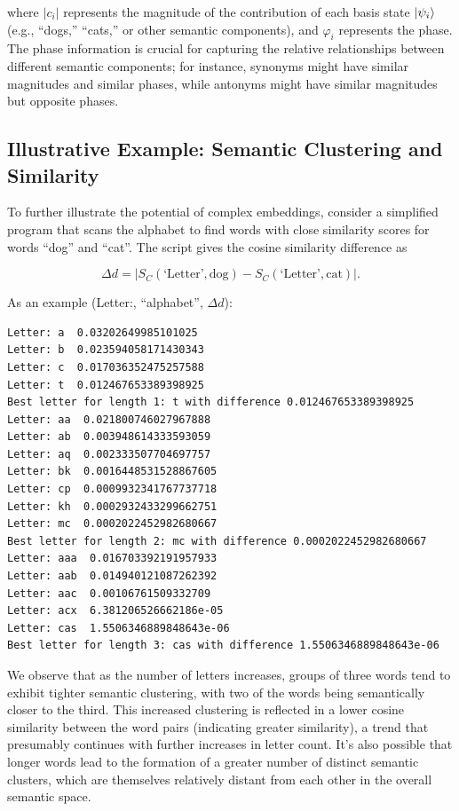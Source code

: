 \documentclass[prd,amsmath,amssymb,12pt]{revtex4}
\DeclarePairedDelimiter\ket{\lvert}{\rangle}
\begin{document}
\noindent
where $|c_i|$ represents the magnitude of the contribution of each basis state $\ket{\psi_i}$
(e.g., ``dogs,'' ``cats,'' or other semantic components), and $\varphi_i$ represents the phase.
The phase information is crucial for capturing the relative relationships between different
semantic components; for instance, synonyms might have similar magnitudes and similar phases,
while antonyms might have similar magnitudes but opposite phases.

\subsection{Illustrative Example: Semantic Clustering and Similarity}

To further illustrate the potential of complex embeddings, consider a simplified program that scans
the alphabet to find words with close similarity scores for words ``dog'' and ``cat''. The script gives
the cosine similarity difference as

\begin{equation}
  \Delta d = |S_C(\text{`Letter'}, \text{dog})-S_C(\text{`Letter'},\text{cat})|.
\end{equation}

\noindent
As an example (Letter:, ``alphabet'', $\Delta d$):

\begin{verbatim}
Letter: a  0.03202649985101025
Letter: b  0.023594058171430343
Letter: c  0.017036352475257588
Letter: t  0.012467653389398925
Best letter for length 1: t with difference 0.012467653389398925
Letter: aa  0.021800746027967888
Letter: ab  0.003948614333593059
Letter: aq  0.002333507704697757
Letter: bk  0.0016448531528867605
Letter: cp  0.0009932341767737718
Letter: kh  0.0002932433299662751
Letter: mc  0.0002022452982680667
Best letter for length 2: mc with difference 0.0002022452982680667
Letter: aaa  0.016703392191957933
Letter: aab  0.014940121087262392
Letter: aac  0.00106761509332709
Letter: acx  6.381206526662186e-05
Letter: cas  1.5506346889848643e-06
Best letter for length 3: cas with difference 1.5506346889848643e-06
\end{verbatim}

\noindent
We observe that as the number of letters increases, groups of three words tend to exhibit tighter semantic clustering,
with two of the words being semantically closer to the third. This increased clustering is reflected in a lower cosine
similarity between the word pairs (indicating greater similarity), a trend that presumably continues with further
increases in letter count. It's also possible that longer words lead to the formation of a greater number of
distinct semantic
clusters, which are themselves relatively distant from each other in the overall semantic space.
\end{document}
